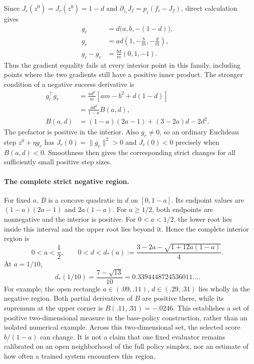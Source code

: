 \documentclass[11pt]{article}
\begin{document}
Since $J_c(z^0)=J_r(z^0)=1-d$ and
$\partial_{z_i}J_f=p_i(f_i-J_f)$, direct calculation gives
\begin{align}
 g_c&=d\bigl(a,b,-(1-d)\bigr),\nonumber\\
 g_r&=ad\left(1,-\frac b m,-\frac d m\right),\label{eq:family_gradients}\\
 g_c-g_r&=\frac{bd}{m}(0,1,-1).\nonumber
\end{align}
Thus the gradient equality fails at every interior point in this family,
including points where the two gradients still have a positive inner product.
The stronger condition of a negative success derivative is
\begin{align}
 g_c^\top g_r
 &=\frac{ad^2}{m}\left[am-b^2+d(1-d)\right]\nonumber\\
 &=\frac{ad^2}{1-a}B(a,d),\label{eq:family_dot}\\
 B(a,d)&=(1-a)(2a-1)+(3-2a)d-2d^2.\nonumber
\end{align}
The prefactor is positive in the interior. Also $g_r\ne0$, so an ordinary
Euclidean step $z^0+\eta g_r$ has
$\dot J_r(0)=\lVert g_r\rVert^2>0$ and
$\dot J_c(0)<0$ precisely when $B(a,d)<0$.
Smoothness then gives the corresponding strict changes for all sufficiently
small positive step sizes.

\paragraph{The complete strict negative region.}
For fixed $a$, $B$ is a concave quadratic in $d$ on $[0,1-a]$.
Its endpoint values are $(1-a)(2a-1)$ and $2a(1-a)$.
For $a\geq1/2$, both endpoints are nonnegative and the interior is positive.
For $0<a<1/2$, the lower root lies inside this interval and the upper root
lies beyond it. Hence the complete interior region is
\begin{equation}
 0<a<\frac12,\qquad
 0<d<d_*(a):=
 \frac{3-2a-\sqrt{1+12a(1-a)}}4.
 \label{eq:family_negative_region}
\end{equation}
At $a=1/10$,
\begin{equation}
 d_*(1/10)=\frac{7-\sqrt{13}}{10}
 =0.3394448724536011\ldots.
 \label{eq:family_slice_root}
\end{equation}
For example, the open rectangle
$a\in(.09,.11)$, $d\in(.29,.31)$ lies wholly in the negative region.
Both partial derivatives of $B$ are positive there, while its supremum
at the upper corner is $B(.11,.31)=-.0246$.
This establishes a set of positive two-dimensional measure in the
base-policy construction, rather than an isolated numerical example.
Across this two-dimensional set, the selected score $b/(1-a)$ can change.
It is not a claim that one fixed evaluator remains calibrated on an open
neighborhood of the full policy simplex, nor an estimate of how often a
trained system encounters this region.
\end{document}
